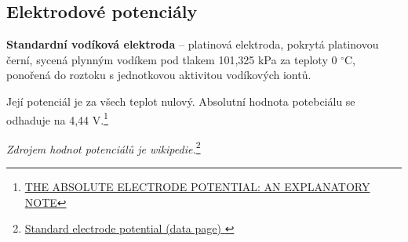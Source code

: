 

\newpage

\subsection{Elektrodové potenciály}

\textbf{Standardní vodíková elektroda} -- platinová elektroda, pokrytá platinovou černí, sycená plynným vodíkem pod tlakem 101,325 kPa za teploty 0 $^\circ$C, ponořená do roztoku s jednotkovou aktivitou vodíkových iontů.


Její potenciál je za všech teplot nulový. Absolutní hodnota potebciálu se odhaduje na 4,44 V.\footnote{\href{https://publications.iupac.org/pac/1986/pdf/5807x0955.pdf}{THE ABSOLUTE ELECTRODE POTENTIAL: AN EXPLANATORY NOTE}}

\newpage

\textit{Zdrojem hodnot potenciálů je wikipedie.}\footnote{\href{https://en.wikipedia.org/wiki/Standard_electrode_potential_(data_page)}{Standard electrode potential (data page)
}}


